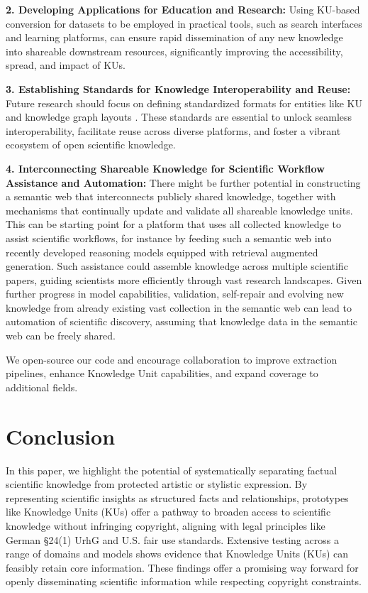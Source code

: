 \textbf{2. Developing Applications for Education and Research:}  Using KU-based conversion for datasets to be employed in practical tools, such as search interfaces and learning platforms, can ensure rapid dissemination of any new knowledge into shareable downstream resources, significantly improving the accessibility, spread, and impact of KUs.

\textbf{3. Establishing Standards for Knowledge Interoperability and Reuse:}  Future research should focus on defining standardized formats for entities like KU and knowledge graph layouts \citep{lenat1990cyc}. These standards are essential to unlock seamless interoperability, facilitate reuse across diverse platforms, and foster a vibrant ecosystem of open scientific knowledge. 

\textbf{4. Interconnecting Shareable Knowledge for Scientific Workflow Assistance and Automation:} There might be further potential in constructing a semantic web that interconnects publicly shared knowledge, together with mechanisms that continually update and validate all shareable knowledge units. This can be starting point for a platform that uses all collected knowledge to assist scientific workflows, for instance by feeding such a semantic web into recently developed reasoning models equipped with retrieval augmented generation. Such assistance could assemble knowledge across multiple scientific papers, guiding scientists more efficiently through vast research landscapes. Given further progress in model capabilities, validation, self-repair and evolving new knowledge from already existing vast collection in the semantic web can lead to automation of scientific discovery, assuming that knowledge data in the semantic web can be freely shared.

We open-source our code and encourage collaboration to improve extraction pipelines, enhance Knowledge Unit capabilities, and expand coverage to additional fields.

\vspace{-0.2cm}
\section{Conclusion}
\vspace{-0.1cm}

In this paper, we highlight the potential of systematically separating factual scientific knowledge from protected artistic or stylistic expression. By representing scientific insights as structured facts and relationships, prototypes like Knowledge Units (KUs) offer a pathway to broaden access to scientific knowledge without infringing copyright, aligning with legal principles like German \S 24(1) UrhG and U.S. fair use standards. Extensive testing across a range of domains and models shows evidence that Knowledge Units (KUs) can feasibly retain core information. These findings offer a promising way forward for openly disseminating scientific information while respecting copyright constraints.

